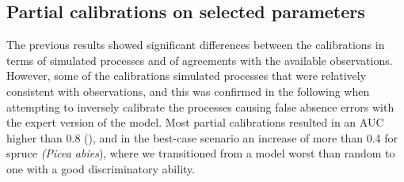 \documentclass[preprint,12pt,authoryear]{elsarticle}
\begin{document}
\subsection{Partial calibrations on selected parameters}

The previous results showed significant differences between the calibrations in terms of simulated processes and of agreements with the available observations. However, some of the calibrations simulated processes that were relatively consistent with observations, and this was confirmed in the following when attempting to inversely calibrate the processes causing false absence errors with the expert version of the model. Most partial calibrations resulted in an AUC higher than 0.8 (), and in the best-case scenario an increase of more than 0.4 for spruce \emph{(Picea abies}), where we transitioned from a model worst than random to one with a good discriminatory ability.
\end{document}
